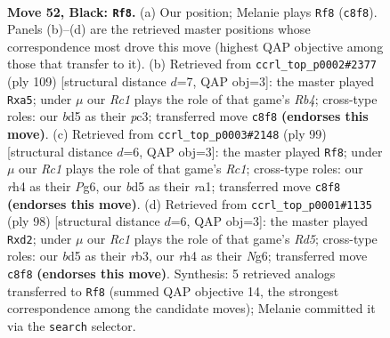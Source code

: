 \documentclass[11pt]{article}
\begin{document}
\clearpage

\begin{figure}[p]\centering
\begin{subfigure}{0.46\textwidth}\centering
\resizebox{\linewidth}{!}{%
\newchessgame
\chessboard[
  setfen={2r5/3k4/1P6/3B4/7R/4K3/8/8 b - - 0 52},
  showmover=false,
  pgfstyle=straightmove, color=movearrow, markmove={c8-f8}
]}
\caption{}
\end{subfigure}\hfill
\begin{subfigure}{0.46\textwidth}\centering
\resizebox{\linewidth}{!}{%
\newchessgame
\chessboard[
  setfen={8/8/2k5/Pr6/8/2P5/7R/2K5 b - - 2 55},
  showmover=false,
  pgfstyle=straightmove, color=movearrow, markmove={b5-a5}
]}
\caption{}
\end{subfigure}
\\[4pt]
\begin{subfigure}{0.46\textwidth}\centering
\resizebox{\linewidth}{!}{%
\newchessgame
\chessboard[
  setfen={2r5/3k4/6p1/8/4K3/2P5/8/R7 b - - 3 50},
  showmover=false,
  pgfstyle=straightmove, color=movearrow, markmove={c8-f8}
]}
\caption{}
\end{subfigure}\hfill
\begin{subfigure}{0.46\textwidth}\centering
\resizebox{\linewidth}{!}{%
\newchessgame
\chessboard[
  setfen={8/2k5/6N1/3R4/4K3/1r6/3p4/8 w - - 2 50},
  showmover=false,
  pgfstyle=straightmove, color=movearrow, markmove={d5-d2}
]}
\caption{}
\end{subfigure}
\caption{\textbf{Move 52, Black: \texttt{Rf8}.} (a) Our position; Melanie plays \texttt{Rf8} (\texttt{c8f8}). Panels (b)--(d) are the retrieved master positions whose correspondence most drove this move (highest QAP objective among those that transfer to it). (b) Retrieved from \texttt{ccrl\_top\_p0002\#2377} (ply 109) [structural distance $d$=7, QAP obj=3]: the master played \texttt{Rxa5}; under $\mu$ our \emph{Rc1} plays the role of that game's \emph{Rb4}; cross-type roles: our \emph{b}d5 as their \emph{p}c3; transferred move \texttt{c8f8} \textbf{(endorses this move)}. (c) Retrieved from \texttt{ccrl\_top\_p0003\#2148} (ply 99) [structural distance $d$=6, QAP obj=3]: the master played \texttt{Rf8}; under $\mu$ our \emph{Rc1} plays the role of that game's \emph{Rc1}; cross-type roles: our \emph{r}h4 as their \emph{P}g6, our \emph{b}d5 as their \emph{r}a1; transferred move \texttt{c8f8} \textbf{(endorses this move)}. (d) Retrieved from \texttt{ccrl\_top\_p0001\#1135} (ply 98) [structural distance $d$=6, QAP obj=3]: the master played \texttt{Rxd2}; under $\mu$ our \emph{Rc1} plays the role of that game's \emph{Rd5}; cross-type roles: our \emph{b}d5 as their \emph{r}b3, our \emph{r}h4 as their \emph{N}g6; transferred move \texttt{c8f8} \textbf{(endorses this move)}. Synthesis: 5 retrieved analogs transferred to \texttt{Rf8} (summed QAP objective 14, the strongest correspondence among the candidate moves); Melanie committed it via the \texttt{search} selector.}
\label{fig:thought-m103}
\end{figure}
\end{document}
